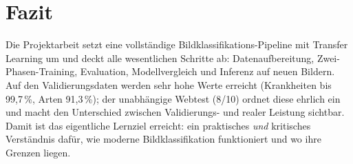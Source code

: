 \documentclass[11pt,a4paper]{article}
\begin{document}
\section{Fazit}
Die Projektarbeit setzt eine vollständige Bildklassifikations-Pipeline mit
Transfer Learning um und deckt alle wesentlichen Schritte ab: Datenaufbereitung,
Zwei-Phasen-Training, Evaluation, Modellvergleich und Inferenz auf neuen Bildern.
Auf den Validierungsdaten werden sehr hohe Werte erreicht (Krankheiten bis
99{,}7\,\%, Arten 91{,}3\,\%); der unabhängige Webtest (8/10) ordnet diese
ehrlich ein und macht den Unterschied zwischen Validierungs- und realer
Leistung sichtbar. Damit ist das eigentliche Lernziel erreicht: ein praktisches
\emph{und} kritisches Verständnis dafür, wie moderne Bildklassifikation
funktioniert und wo ihre Grenzen liegen.
\end{document}
